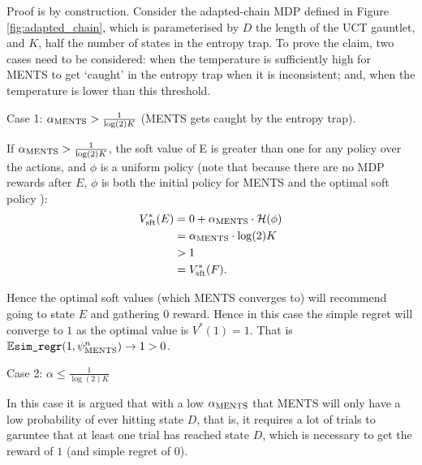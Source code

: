     \begin{proofoutline}


        Proof is by construction. Consider the adapted-chain MDP  defined in Figure \ref{fig:adapted_chain}, which is parameterised by $D$ the length of the UCT gauntlet, and $K$, half the number of states in the entropy trap. To prove the claim, two cases need to be considered: when the temperature is sufficiently high for MENTS to get `caught' in the entropy trap when it is inconsistent; and, when the temperature is lower than this threshold.
        
        Case 1: ${\alpha_{{\textnormal{MENTS}}}}>\frac{1}{\log(2)K}$ (MENTS gets caught by the entropy trap).
        
        If ${\alpha_{{\textnormal{MENTS}}}}>\frac{1}{\log(2)K}$, the soft value of E is greater than one for any policy over the actions, and $\phi$ is a uniform policy (note that because there are no MDP rewards after $E$, $\phi$ is both the initial policy for MENTS and the optimal soft policy ): 
        \begin{align}
                V_{{\textnormal{sft}}}^*(E) & = 0 + {\alpha_{{\textnormal{MENTS}}}} \cdot \mathcal{H}(\phi) \\
                    & = {\alpha_{{\textnormal{MENTS}}}} \cdot \log(2)  K \\
                    & > 1 \\
                    & = V_{{\textnormal{sft}}}^*(F).
        \end{align}
        
        Hence the optimal soft values (which MENTS converges to) will recommend going to state $E$ and gathering $0$ reward. Hence in this case the simple regret will converge to $1$ as the optimal value is $V^*(1)=1$. That is $\mathbb{E}{\textnormal{\texttt{sim\_regr}}}(1,\psi^{n}_{{\textnormal{MENTS}}}) \rightarrow 1 > 0$.
        
        Case 2: $\alpha\leq\frac{1}{\log(2)K}$ 
        
        In this case it is argued that with a low ${\alpha_{{\textnormal{MENTS}}}}$ that MENTS will only have a low probability of ever hitting state $D$, that is, it requires a lot of trials to garuntee that at least one trial has reached state $D$, which is necessary to get the reward of $1$ (and simple regret of $0$).
        

\end{proofoutline}
